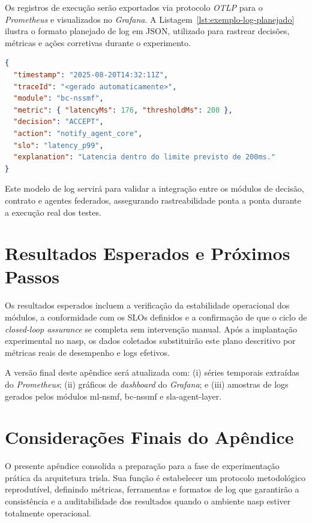Os registros de execução serão exportados via protocolo \textit{OTLP} para o \textit{Prometheus} e visualizados no \textit{Grafana}.  
A Listagem~\ref{lst:exemplo-log-planejado} ilustra o formato planejado de log em JSON, utilizado para rastrear decisões, métricas e ações corretivas durante o experimento.

\begin{lstlisting}[language=JSON, caption={Exemplo de formato de log planejado para observabilidade da execução.}, label={lst:exemplo-log-planejado}]
{
  "timestamp": "2025-08-20T14:32:11Z",
  "traceId": "<gerado automaticamente>",
  "module": "bc-nssmf",
  "metric": { "latencyMs": 176, "thresholdMs": 200 },
  "decision": "ACCEPT",
  "action": "notify_agent_core",
  "slo": "latency_p99",
  "explanation": "Latencia dentro do limite previsto de 200ms."
}
\end{lstlisting}

Este modelo de log servirá para validar a integração entre os módulos de decisão, contrato e agentes federados, assegurando rastreabilidade ponta a ponta durante a execução real dos testes.

\section{Resultados Esperados e Próximos Passos}
\label{sec:resultados-esperados}

Os resultados esperados incluem a verificação da estabilidade operacional dos módulos, a conformidade com os \acp{SLO} definidos e a confirmação de que o ciclo de \textit{closed-loop assurance} se completa sem intervenção manual.  
Após a implantação experimental no \ac{nasp}, os dados coletados substituirão este plano descritivo por métricas reais de desempenho e logs efetivos.  

A versão final deste apêndice será atualizada com:  
(i) séries temporais extraídas do \textit{Prometheus};  
(ii) gráficos de \textit{dashboard} do \textit{Grafana}; e  
(iii) amostras de logs gerados pelos módulos \ac{ml-nsmf}, \ac{bc-nssmf} e \ac{sla-agent-layer}.  

\section*{Considerações Finais do Apêndice}

O presente apêndice consolida a preparação para a fase de experimentação prática da arquitetura \ac{trisla}.  
Sua função é estabelecer um protocolo metodológico reprodutível, definindo métricas, ferramentas e formatos de log que garantirão a consistência e a auditabilidade dos resultados quando o ambiente \ac{nasp} estiver totalmente operacional.
